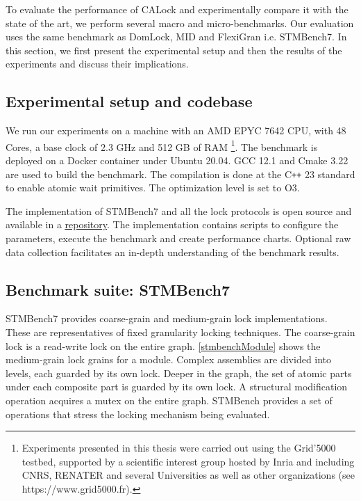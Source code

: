 To evaluate the performance of CALock and experimentally compare it with the state of the art, we perform several macro and micro-benchmarks. Our evaluation uses the same benchmark as DomLock, MID and FlexiGran \cite{kalikar2016domlock,anjuMID,FlexiGran2024} i.e. STMBench7\cite{guerraoui2006stmbench7}. In this section, we first present the experimental setup and then the results of the experiments and discuss their implications. 

\subsection{Experimental setup and codebase}

We run our experiments on a machine with an AMD EPYC 7642 CPU, with 48 Cores, a base clock of 2.3 GHz and 512 GB of RAM \footnote{Experiments presented in this thesis were carried out using the Grid'5000 testbed, supported by a scientific interest group hosted by Inria and including CNRS, RENATER and several Universities as well as other organizations (see https://www.grid5000.fr).}. 
The benchmark is deployed on a Docker container under Ubuntu 20.04. 
GCC 12.1 and Cmake 3.22 are used to build the benchmark. The compilation is done at the C\texttt{++} 23 standard to enable atomic wait primitives. The optimization level is set to O3.

The implementation of STMBench7  and all the lock protocols is open source and available in a \href{https://anonymous.4open.science/r/CALockBench-B117/Readme.md}{\color{blue}\underline{repository}}. The implementation contains scripts to configure the parameters, execute the benchmark and create performance charts. Optional raw data collection facilitates an in-depth understanding of the benchmark results.


\subsection{Benchmark suite: STMBench7}
	
STMBench7 provides coarse-grain and medium-grain lock implementations. These are representatives of fixed granularity locking techniques.   
The coarse-grain lock is a read-write lock on the entire graph. 
\cref{stmbenchModule} shows the medium-grain lock grains for a module. 
Complex assemblies are divided into levels, each guarded by its own lock.
Deeper in the graph, the set of atomic parts under each composite part is guarded by its own lock.
A structural modification operation acquires a mutex on the entire graph. STMBench provides a set of operations that stress the locking mechanism being evaluated. 

